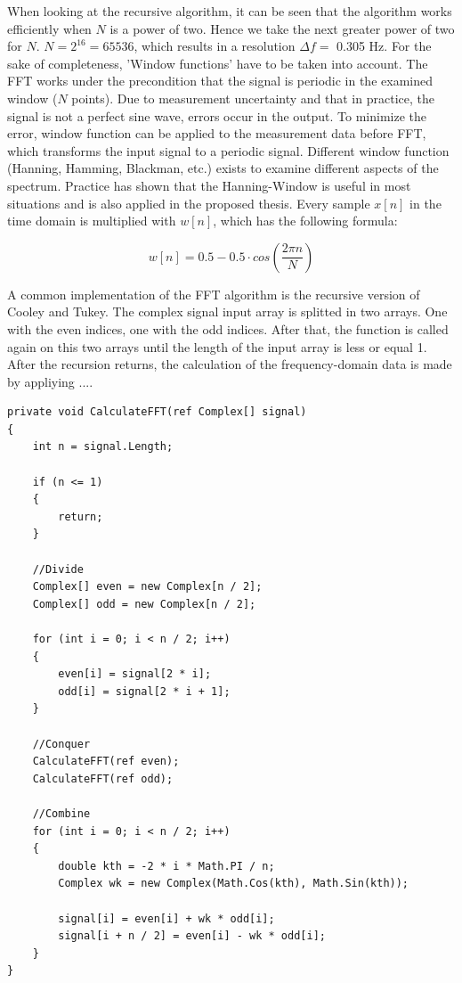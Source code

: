 When looking at the recursive algorithm, it can be seen that the algorithm works efficiently when $N$ is a power of two. Hence we take the next greater power of two for $N$. $N = 2^{16} = 65536$, which results in a resolution $\Delta f = $ 0.305 Hz.
\newline
\newline
For the sake of completeness, 'Window functions' have to be taken into account. The FFT works under the precondition that the signal is periodic in the examined window ($N$ points). Due to measurement uncertainty and that in practice, the signal is not a perfect sine wave, errors occur in the output. To minimize the error, window function can be applied to the measurement data before FFT, which transforms the input signal to a periodic signal. Different window function (Hanning, Hamming, Blackman, etc.) exists to examine different aspects of the spectrum. Practice has shown that the Hanning-Window is useful in most situations and is also applied in the proposed thesis. Every sample $x[n]$ in the time domain is multiplied with $w[n]$, which has the following formula\cite{signalverarbeitung}:

\[w[n] = 0.5 - 0.5 \cdot cos(\frac{2 \pi n}{N})\]

A common implementation of the FFT algorithm is the recursive version of Cooley and Tukey. The complex signal input array is splitted in two arrays. One with the even indices, one with the odd indices. After that, the function is called again on this two arrays until the length of the input array is less or equal 1. After the recursion returns, the calculation of the frequency-domain data is made by appliying .... 

\begin{lstlisting}[frame=single]
private void CalculateFFT(ref Complex[] signal)
{
	int n = signal.Length;

	if (n <= 1)
	{
		return;
	}

	//Divide
	Complex[] even = new Complex[n / 2];
	Complex[] odd = new Complex[n / 2];

	for (int i = 0; i < n / 2; i++)
	{
		even[i] = signal[2 * i];
		odd[i] = signal[2 * i + 1];
	}

	//Conquer
	CalculateFFT(ref even);
	CalculateFFT(ref odd);

	//Combine
	for (int i = 0; i < n / 2; i++)
	{
		double kth = -2 * i * Math.PI / n;
		Complex wk = new Complex(Math.Cos(kth), Math.Sin(kth));

		signal[i] = even[i] + wk * odd[i];
		signal[i + n / 2] = even[i] - wk * odd[i];
	}
}
\end{lstlisting}
